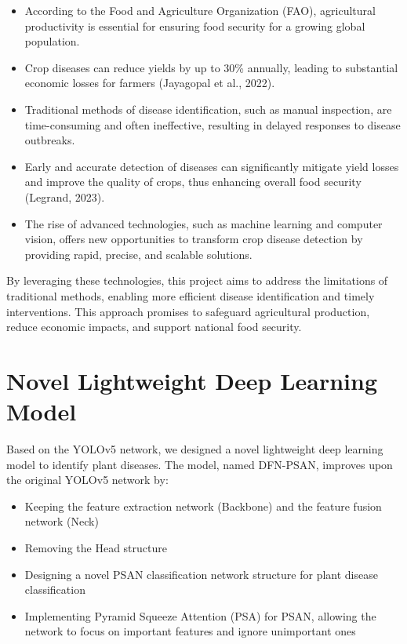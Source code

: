 \documentclass[12pt,a4paper]{article}
\begin{document}
\begin{itemize}
  \item According to the Food and Agriculture Organization (FAO), agricultural productivity is essential for ensuring food security for a growing global population.
  \item Crop diseases can reduce yields by up to 30\% annually, leading to substantial economic losses for farmers (Jayagopal et al., 2022).
  \item Traditional methods of disease identification, such as manual inspection, are time-consuming and often ineffective, resulting in delayed responses to disease outbreaks.
  \item Early and accurate detection of diseases can significantly mitigate yield losses and improve the quality of crops, thus enhancing overall food security (Legrand, 2023).
  \item The rise of advanced technologies, such as machine learning and computer vision, offers new opportunities to transform crop disease detection by providing rapid, precise, and scalable solutions.
\end{itemize}

By leveraging these technologies, this project aims to address the limitations of traditional methods, enabling more efficient disease identification and timely interventions. This approach promises to safeguard agricultural production, reduce economic impacts, and support national food security.

\section{Novel Lightweight Deep Learning Model}
Based on the YOLOv5 network, we designed a novel lightweight deep learning model to identify plant diseases. The model, named DFN-PSAN, improves upon the original YOLOv5 network by:

\begin{itemize}
  \item Keeping the feature extraction network (Backbone) and the feature fusion network (Neck)
  \item Removing the Head structure
  \item Designing a novel PSAN classification network structure for plant disease classification
  \item Implementing Pyramid Squeeze Attention (PSA) for PSAN, allowing the network to focus on important features and ignore unimportant ones
\end{itemize}
\end{document}
